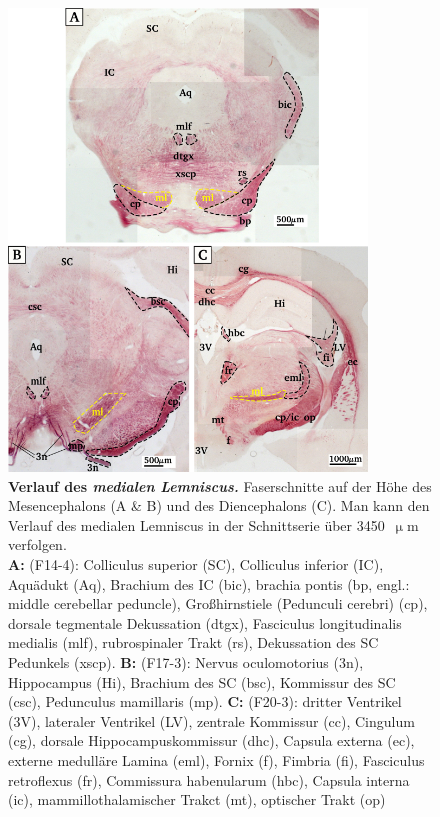 \documentclass[12pt,a4paper,pdftex]{article}
\begin{document}
\begin{figure}[H]
    \centering
    \includegraphics[width = 0.85\textwidth] {pictures/somatosensory/medial_lemniscus.png}
    \caption[Verlauf des medialen Lemniscus]{\small{\textbf{Verlauf des \textit{medialen Lemniscus.}} Faserschnitte auf der Höhe des Mesencephalons (A \& B) und des Diencephalons (C). Man kann den Verlauf des medialen Lemniscus in der Schnittserie über 3450~$\upmu$m verfolgen.\\
    \textbf{A:} (F14-4): Colliculus superior (SC), Colliculus inferior (IC), Aquädukt (Aq), Brachium des IC (bic), brachia pontis (bp, engl.: middle cerebellar peduncle), Großhirnstiele (Pedunculi cerebri) (cp), dorsale tegmentale Dekussation (dtgx), Fasciculus longitudinalis medialis (mlf), rubrospinaler Trakt (rs), Dekussation des SC Pedunkels (xscp).
    \textbf{B:} (F17-3): Nervus oculomotorius (3n), Hippocampus (Hi), Brachium des SC (bsc), Kommissur des SC (csc), Pedunculus mamillaris (mp).
    \textbf{C:} (F20-3): dritter Ventrikel (3V), lateraler Ventrikel (LV), zentrale Kommissur (cc), Cingulum (cg), dorsale Hippocampuskommissur (dhc), Capsula externa (ec), externe medulläre Lamina (eml), Fornix (f), Fimbria (fi), Fasciculus retroflexus (fr), Commissura habenularum (hbc), Capsula interna (ic), mammillothalamischer Trakct (mt), optischer Trakt (op)}}
    \label{fig:medialer_lemniscus}
\end{figure}
\end{document}
